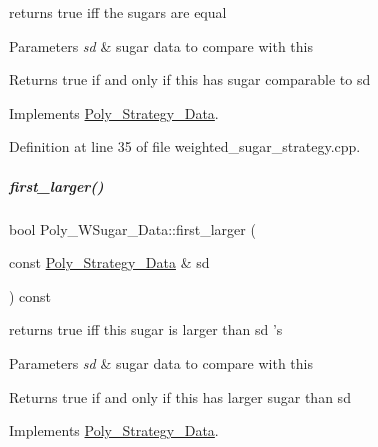 returns {\ttfamily true} iff the sugars are equal 


\begin{DoxyParams}{Parameters}
{\em sd} & sugar data to compare with {\ttfamily this} \\
\hline
\end{DoxyParams}
\begin{DoxyReturn}{Returns}
true if and only if {\ttfamily this} has sugar comparable to {\ttfamily sd} 
\end{DoxyReturn}


Implements \hyperlink{group__strategygroup_aa82a57a8bf9b3c14fd65a573fd78a4a5}{Poly\+\_\+\+Strategy\+\_\+\+Data}.



Definition at line 35 of file weighted\+\_\+sugar\+\_\+strategy.\+cpp.

\mbox{\label{group__strategygroup_a83a899b8195beed8d72d692fe4c228a3}} 
\subparagraph{\texorpdfstring{first\+\_\+larger()}{first\_larger()}}
{\footnotesize\ttfamily bool Poly\+\_\+\+W\+Sugar\+\_\+\+Data\+::first\+\_\+larger (\begin{DoxyParamCaption}\item[{const \hyperlink{group__strategygroup_class_poly___strategy___data}{Poly\+\_\+\+Strategy\+\_\+\+Data} \&}]{sd }\end{DoxyParamCaption}) const\hspace{0.3cm}{\ttfamily [virtual]}}



returns {\ttfamily true} iff {\ttfamily this} sugar is larger than {\ttfamily sd} 's 


\begin{DoxyParams}{Parameters}
{\em sd} & sugar data to compare with {\ttfamily this} \\
\hline
\end{DoxyParams}
\begin{DoxyReturn}{Returns}
{\ttfamily true} if and only if {\ttfamily this} has larger sugar than {\ttfamily sd} 
\end{DoxyReturn}


Implements \hyperlink{group__strategygroup_a6cd4608015a6b0f06141b9b73b0d4137}{Poly\+\_\+\+Strategy\+\_\+\+Data}.



